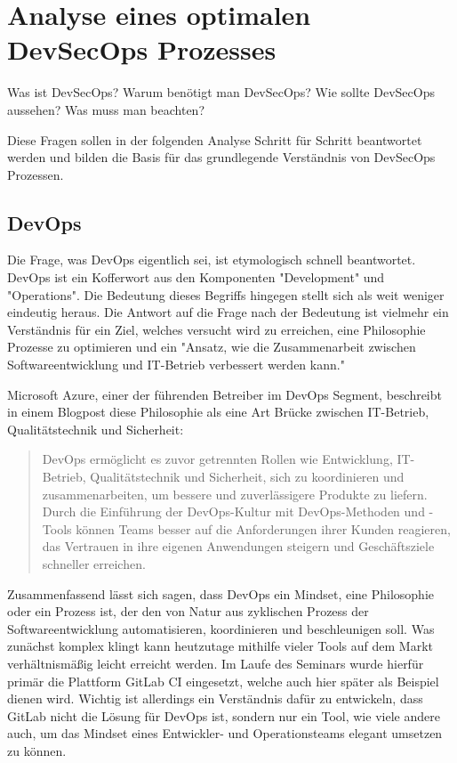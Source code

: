 \section{Analyse eines optimalen DevSecOps Prozesses}\label{sec:analysisDevSecOps}
Was ist DevSecOps?
Warum benötigt man DevSecOps?
Wie sollte DevSecOps aussehen?
Was muss man beachten?

Diese Fragen sollen in der folgenden Analyse Schritt für Schritt beantwortet werden und bilden die Basis für das grundlegende Verständnis von DevSecOps Prozessen.

\subsection{DevOps}
Die Frage, was DevOps eigentlich sei, ist etymologisch schnell beantwortet.
DevOps ist ein Kofferwort aus den Komponenten "Development" und "Operations".
Die Bedeutung dieses Begriffs hingegen stellt sich als weit weniger eindeutig heraus.
Die Antwort auf die Frage nach der Bedeutung ist vielmehr ein Verständnis für ein Ziel, welches versucht wird zu erreichen, eine Philosophie Prozesse zu optimieren und ein "Ansatz, wie die Zusammenarbeit zwischen Softwareentwicklung und IT-Betrieb verbessert werden kann."\cite{DevOps2021}

Microsoft Azure, einer der führenden Betreiber im DevOps Segment, beschreibt in einem Blogpost diese Philosophie als eine Art Brücke zwischen IT-Betrieb, Qualitätstechnik und Sicherheit\cite{WasIstDevOps}:
\begin{quote}
    DevOps ermöglicht es zuvor getrennten Rollen wie Entwicklung, IT-Betrieb, Qualitätstechnik und Sicherheit, sich zu koordinieren und zusammenarbeiten, um bessere und zuverlässigere Produkte zu liefern. Durch die Einführung der DevOps-Kultur mit DevOps-Methoden und -Tools können Teams besser auf die Anforderungen ihrer Kunden reagieren, das Vertrauen in ihre eigenen Anwendungen steigern und Geschäftsziele schneller erreichen.
\end{quote}

Zusammenfassend lässt sich sagen, dass DevOps ein Mindset, eine Philosophie oder ein Prozess ist, der den von Natur aus zyklischen Prozess der Softwareentwicklung automatisieren, koordinieren und beschleunigen soll.
Was zunächst komplex klingt kann heutzutage mithilfe vieler Tools auf dem Markt verhältnismäßig leicht erreicht werden.
Im Laufe des Seminars wurde hierfür primär die Plattform GitLab CI eingesetzt, welche auch hier später als Beispiel dienen wird.
Wichtig ist allerdings ein Verständnis dafür zu entwickeln, dass GitLab nicht die Lösung für DevOps ist, sondern nur ein Tool, wie viele andere auch, um das Mindset eines Entwickler- und Operationsteams elegant umsetzen zu können.

